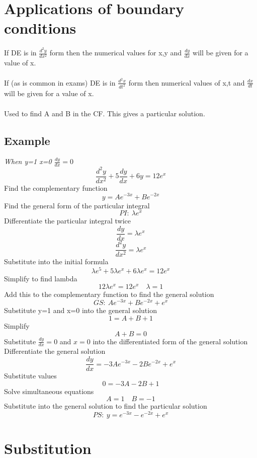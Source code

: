 \documentclass{article}[18pt]
\begin{document}
\section{Applications of boundary conditions}
If DE is in $\frac{d^2y}{dx^2}$ form then the numerical values for x,y and $\frac{dy}{dx}$ will be given for a value of x.\\
\\
If (as is common in exams) DE is in $\frac{d^2x}{dt^2}$ form then numerical values of x,t and $\frac{dx}{dt}$ will be given for a value of x.\\
\\
Used to find A and B in the CF. This gives a particular solution.
\subsection{Example}
\textit{When y=1 x=0 $\frac{dy}{dx}=0$}
\\
$$\frac{d^2y}{dx^2}+5\frac{dy}{dx}+6y=12e^x$$
Find the complementary function
$$y=Ae^{-3x}+Be^{-2x}$$
Find the general form of the particular integral
$$PI: \ \lambda e^x$$
Differentiate the particular integral twice
$$\frac{dy}{dx}=\lambda e^x$$
$$\frac{d^2y}{dx^2}=\lambda e^x$$
Substitute into the initial formula
$$\lambda e^5+5\lambda e^x+6\lambda e^x=12e^x$$
Simplify to find lambda
$$12\lambda e^x=12e^x \quad	\lambda=1$$
Add this to the complementary function to find the general solution
$$GS:\ Ae^{-3x}+Be^{-2x}+e^x$$
Substitute y=1 and x=0 into the general solution
$$1=A+B+1$$
Simplify
$$A+B=0$$
Substitute $\frac{dy}{dx}=0$ and $x=0$ into the differentiated form of the general solution\\
Differentiate the general solution
$$\frac{dy}{dx}=-3Ae^{-3x}-2Be^{-2x}+e^x$$
Substitute values
$$0=-3A-2B+1$$
Solve simultaneous equations
$$A=1 \quad B=-1$$
Substitute into the general solution to find the particular solution
$$PS: \ y=e^{-3x}-e^{-2x}+e^x$$
\newpage
\section{Substitution}
\setcounter{equation}{0}
\end{document}
